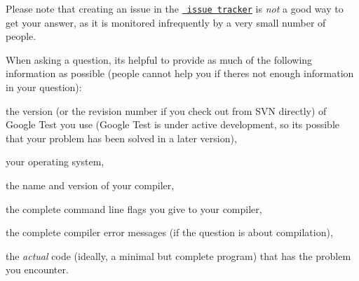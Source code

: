 Please note that creating an issue in the \href{http://code.google.com/p/googletest/issues/list}\texttt{ issue tracker} is {\itshape not} a good way to get your answer, as it is monitored infrequently by a very small number of people.

When asking a question, it\textquotesingle{}s helpful to provide as much of the following information as possible (people cannot help you if there\textquotesingle{}s not enough information in your question)\+:


\begin{DoxyItemize}
\item the version (or the revision number if you check out from S\+VN directly) of Google Test you use (Google Test is under active development, so it\textquotesingle{}s possible that your problem has been solved in a later version),
\item your operating system,
\item the name and version of your compiler,
\item the complete command line flags you give to your compiler,
\item the complete compiler error messages (if the question is about compilation),
\item the {\itshape actual} code (ideally, a minimal but complete program) that has the problem you encounter. 
\end{DoxyItemize}